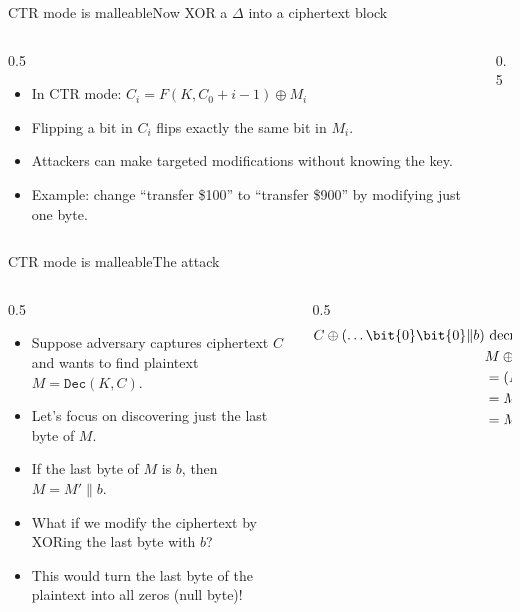 \ifdefined\PRESENTATION\else\PassOptionsToClass{handout}{beamer}\fi\documentclass[aspectratio=169, lualatex]{beamer}
\begin{document}
\begin{frame}{CTR mode is malleable}{Now XOR a $\Delta$ into a ciphertext block}
	\begin{columns}[c]
		\begin{column}{0.5\textwidth}
			\begin{itemize}
				\item In CTR mode: $C_i = F(K, C_0 + i - 1) \oplus M_i$
				\item Flipping a bit in $C_i$ flips exactly the same bit in $M_i$.
				\item Attackers can make targeted modifications without knowing the key.
				\item Example: change ``transfer \$100'' to ``transfer \$900'' by modifying just one byte.
			\end{itemize}
		\end{column}
		\begin{column}{0.5\textwidth}
		\end{column}
	\end{columns}
\end{frame}

\begin{frame}{CTR mode is malleable}{The attack}
	\begin{columns}[c]
		\begin{column}{0.5\textwidth}
			\begin{itemize}
				\item Suppose adversary captures ciphertext $C$ and wants to find plaintext $M = \texttt{Dec}(K, C)$.
				\item Let's focus on discovering just the last byte of $M$.
				\item If the last byte of $M$ is $b$, then $M = M' \| b$.
				\item What if we modify the ciphertext by XORing the last byte with $b$?
				\item This would turn the last byte of the plaintext into all zeros (null byte)!
			\end{itemize}
		\end{column}
		\begin{column}{0.5\textwidth}
			\begin{align*}
				C \oplus (\ldots \bit{0}\bit{0} \| b) & \text{ decrypts to:}                            \\
				                                      & M \oplus (\ldots \bit{0}\bit{0} \| b)           \\
				                                      & = (M' \| b) \oplus (\ldots \bit{0}\bit{0} \| b) \\
				                                      & = M' \| (b \oplus b)                            \\
				                                      & = M' \| \bit{0}\bit{0}
			\end{align*}
		\end{column}
	\end{columns}
\end{frame}
\end{document}
